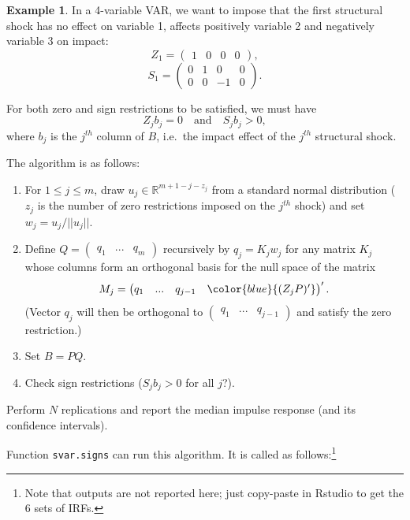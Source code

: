 \documentclass[
  12pt,
]{book}
\providecommand{\tightlist}{%
  \setlength{\itemsep}{0pt}\setlength{\parskip}{0pt}}
\theoremstyle{definition}
\theoremstyle{definition}
\newtheorem{example}{Example}[chapter]
\theoremstyle{definition}
\theoremstyle{definition}
\theoremstyle{remark}
\begin{document}
\begin{example}
\protect\hypertarget{exm:exMixSignSR}{}\label{exm:exMixSignSR}In a 4-variable VAR, we want to impose that the first structural shock has no effect on variable 1, affects positively variable 2 and negatively variable 3 on impact:
\[Z_1 = \begin{pmatrix}1 & 0 & 0 & 0\end{pmatrix}, \]
\[S_1 = \begin{pmatrix}0 & 1 & 0 & 0\\
0 & 0 & -1 & 0\end{pmatrix}. \]

For both zero and sign restrictions to be satisfied, we must have
\[
Z_jb_j=0 \quad \mbox{and} \quad S_jb_j>0,
\]
where \(b_j\) is the \(j^{th}\) column of \(B\), i.e.~the impact effect of the \(j^{th}\) structural shock.
\end{example}

The algorithm is as follows:

\begin{enumerate}
\def\labelenumi{\arabic{enumi}.}
\tightlist
\item
  For \(1\le j\le m\), draw \(u_j\in \mathbb{R}^{m+1-j-z_j}\) from a standard normal distribution (\(z_j\) is the number of zero restrictions imposed on the \(j^{th}\) shock) and set \(w_j = u_j/||u_j||\).
\item
  Define \(Q= \begin{pmatrix}q_1&...&q_m\end{pmatrix}\) recursively by \(q_j = K_jw_j\) for any matrix \(K_j\) whose columns form an orthogonal basis for the null space of the matrix \[M_j =
  \begin{pmatrix} q_1&...&q_{j-1}&\color{blue}{(Z_jP)'}\end{pmatrix}'.\] (Vector \(q_j\) will then be orthogonal to \(\begin{pmatrix} q_1&...&q_{j-1}\end{pmatrix}\) and satisfy the zero restriction.)
\item
  Set \(B=PQ\).
\item
  Check sign restrictions (\(S_jb_j>0\) for all \(j\)?).
\end{enumerate}

Perform \(N\) replications and report the median impulse response (and its confidence intervals).

Function \texttt{svar.signs} can run this algorithm. It is called as follows:\footnote{Note that outputs are not reported here; just copy-paste in Rstudio to get the 6 sets of IRFs.}
\end{document}
